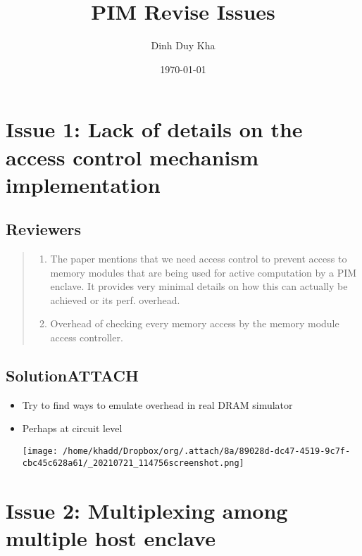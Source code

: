 \documentclass[11pt]{article}
\author{Dinh Duy Kha}
\date{\today}
\title{PIM Revise Issues}
\begin{document}
\maketitle

\section{Issue 1: Lack of details on the access control mechanism implementation}
\label{sec:org81a5d6c}
\subsection{Reviewers}
\label{sec:org4b6e967}
\begin{quote}
\begin{enumerate}
\item The paper mentions that we need access control to prevent access to memory modules that are being used for active computation by a PIM enclave. It provides very minimal details on how this can actually be achieved or its perf. overhead.
\item Overhead of checking every memory access by the memory module access controller.
\end{enumerate}
\end{quote}
\subsection{Solution\hfill{}\textsc{ATTACH}}
\label{sec:orga3ec2b6}
\begin{itemize}
\item Try to find ways to emulate overhead in real DRAM simulator
\item Perhaps at circuit level
\begin{center}
\texttt{[image: /home/khadd/Dropbox/org/.attach/8a/89028d-dc47-4519-9c7f-cbc45c628a61/\_20210721\_114756screenshot.png]}
\end{center}
\end{itemize}

\section{Issue 2: Multiplexing among multiple host enclave}
\label{sec:orgd8e2bc3}
\end{document}
